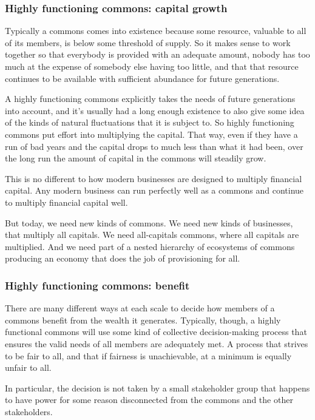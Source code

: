 \subsubsection{Highly functioning commons: capital growth}
Typically a commons comes into existence because some resource, valuable to all of its members, is below some threshold of supply. So it makes sense to work together so that everybody is provided with an adequate amount, nobody has too much at the expense of somebody else having too little, and that that resource continues to be available with sufficient abundance for future generations.


A highly functioning commons explicitly takes the needs of future generations into account, and it’s usually had a long enough existence to also give some idea of the kinds of natural fluctuations that it is subject to. So highly functioning commons put effort into multiplying the capital. That way, even if they have a run of bad years and the capital drops to much less than what it had been, over the long run the amount of capital in the commons will steadily grow.


This is no different to how modern businesses are designed to multiply financial capital. Any modern business can run perfectly well as a commons and continue to multiply financial capital well.


But today, we need new kinds of commons. We need new kinds of businesses, that multiply all capitals. We need all-capitals commons, where all capitals are multiplied. And we need part of a nested hierarchy of ecosystems of commons producing an economy that does the job of provisioning for all.
\subsubsection{Highly functioning commons: benefit}
There are many different ways at each scale to decide how members of a commons benefit from the wealth it generates. Typically, though, a highly functional commons will use some kind of collective decision-making process that ensures the valid needs of all members are adequately met. A process that strives to be fair to all, and that if fairness is unachievable, at a minimum is equally unfair to all.


In particular, the decision is not taken by a small stakeholder group that happens to have power for some reason disconnected from the commons and the other stakeholders.
